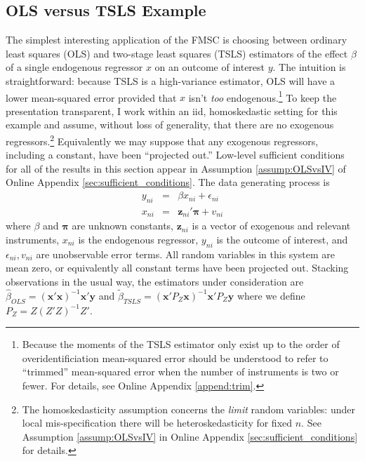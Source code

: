 \subsection{OLS versus TSLS Example}
\label{sec:OLSvsIVExample}
The simplest interesting application of the FMSC is choosing between ordinary least squares (OLS) and two-stage least squares (TSLS) estimators of the effect $\beta$ of a single endogenous regressor $x$ on an outcome of interest $y$.
The intuition is straightforward: because TSLS is a high-variance estimator, OLS will have a lower mean-squared error provided that $x$ isn't \emph{too} endogenous.\footnote{Because the moments of the TSLS estimator only exist up to the order of overidentificiation \citep{Phillips1980, Kinal} mean-squared error should be understood to refer to ``trimmed'' mean-squared error when the number of instruments is two or fewer. For details, see Online Appendix \ref{append:trim}.}
To keep the presentation transparent, I work within an iid, homoskedastic setting for this example and assume, without loss of generality, that there are no exogenous regressors.\footnote{The homoskedasticity assumption concerns the \emph{limit} random variables: under local mis-specification there will be heteroskedasticity for fixed $n$. See Assumption \ref{assump:OLSvsIV} in Online Appendix \ref{sec:sufficient_conditions} for details.}
Equivalently we may suppose that any exogenous regressors, including a constant, have been ``projected out.''
Low-level sufficient conditions for all of the results in this section appear in Assumption \ref{assump:OLSvsIV} of Online Appendix \ref{sec:sufficient_conditions}.
The data generating process is
    \begin{eqnarray}
			y_{ni} &=& \beta x_{ni}  + \epsilon_{ni}\\
	x_{ni} &=& \mathbf{z}_{ni}' \boldsymbol{\pi} + v_{ni}
	\end{eqnarray}
where $\beta$ and $\boldsymbol{\pi}$ are unknown constants, $\mathbf{z}_{ni}$ is a vector of exogenous and relevant instruments, $x_{ni}$ is the endogenous regressor, $y_{ni}$ is the outcome of interest, and $\epsilon_{ni}, v_{ni}$ are unobservable error terms.
All random variables in this system are mean zero, or equivalently all constant terms have been projected out. 
Stacking observations in the usual way, the estimators under consideration are $\widehat{\beta}_{OLS} = \left(\mathbf{x}'\mathbf{x}\right)^{-1}\mathbf{x}'\mathbf{y}$ and
$\widetilde{\beta}_{TSLS} = \left(\mathbf{x}'P_Z\mathbf{x}\right)^{-1}\mathbf{x}'P_Z\mathbf{y}$ where we define $P_Z = Z(Z'Z)^{-1}Z'$. 

